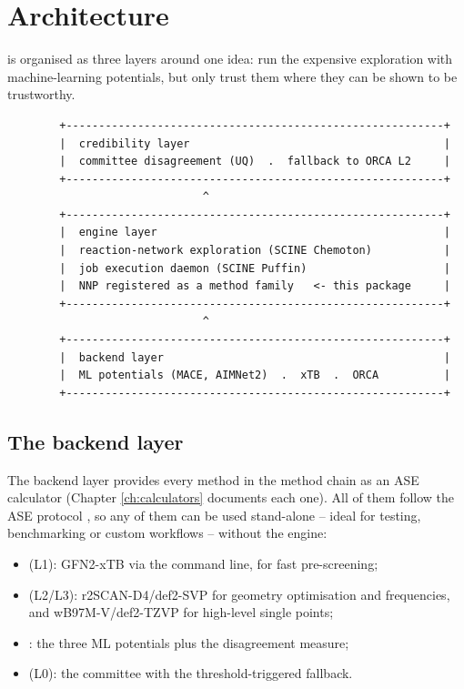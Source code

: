 \chapter{Architecture}
\label{ch:architecture}

\jns{} is organised as three layers around one idea: run the expensive
exploration with machine-learning potentials, but only trust them where
they can be shown to be trustworthy.

\begin{center}
\begin{verbatim}
        +----------------------------------------------------------+
        |  credibility layer                                       |
        |  committee disagreement (UQ)  .  fallback to ORCA L2     |
        +----------------------------------------------------------+
                              ^
        +----------------------------------------------------------+
        |  engine layer                                            |
        |  reaction-network exploration (SCINE Chemoton)           |
        |  job execution daemon (SCINE Puffin)                     |
        |  NNP registered as a method family   <- this package     |
        +----------------------------------------------------------+
                              ^
        +----------------------------------------------------------+
        |  backend layer                                           |
        |  ML potentials (MACE, AIMNet2)  .  xTB  .  ORCA          |
        +----------------------------------------------------------+
\end{verbatim}
\end{center}

\section{The backend layer}

The backend layer provides every method in the method chain as an ASE
calculator (Chapter \ref{ch:calculators} documents each one).  All of them
follow the ASE  protocol \cite{larsen2017ase}, so any of
them can be used stand-alone -- ideal for testing, benchmarking or custom
workflows -- without the engine:

\begin{itemize}
  \item {} (L1): GFN2-xTB \cite{bannwarth2019gfn2} via the
     command line, for fast pre-screening;
  \item {} (L2/L3): r2SCAN-D4/def2-SVP
    \cite{furness2020r2scan,caldeweyher2019d4} for geometry optimisation and
    frequencies, and wB97M-V/def2-TZVP \cite{mardirossian2016wb97mv} for
    high-level single points;
  \item {}: the three ML potentials plus the disagreement
    measure;
  \item {} (L0): the committee with the
    threshold-triggered fallback.
\end{itemize}

